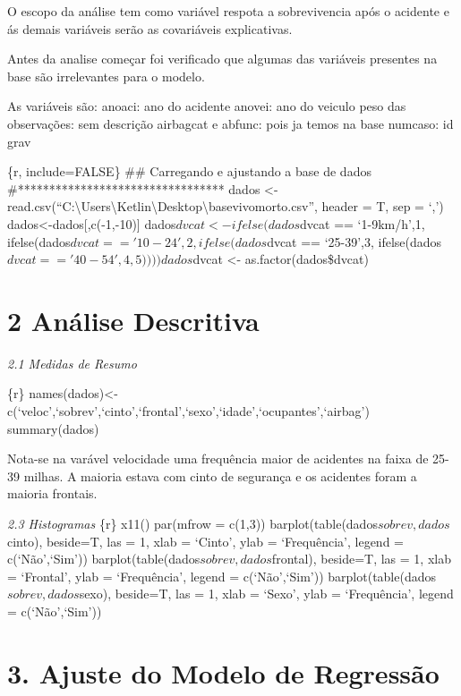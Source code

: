 \documentclass[]{article}
\begin{document}
O escopo da análise tem como variável respota a sobrevivencia após o
acidente e ás demais variáveis serão as covariáveis explicativas.

Antes da analise começar foi verificado que algumas das variáveis
presentes na base são irrelevantes para o modelo.

As variáveis são: anoaci: ano do acidente anovei: ano do veiculo peso
das observações: sem descrição airbagcat e abfunc: pois ja temos na base
numcaso: id grav

\{r, include=FALSE\} \#\# Carregando e ajustando a base de dados
\#********************************* dados \textless{}-
read.csv(``C:\textbackslash{}Users\textbackslash{}Ketlin\textbackslash{}Desktop\textbackslash{}basevivomorto.csv'',
header = T, sep = `,') dados\textless{}-dados{[},c(-1,-10){]}
dados\(dvcat <- ifelse(dados\)dvcat == `1-9km/h',1,
ifelse(dados\(dvcat == '10-24',2,  ifelse(dados\)dvcat == `25-39',3,
ifelse(dados\(dvcat == '40-54',4,5)))) dados\)dvcat \textless{}-
as.factor(dados\$dvcat)

\hypertarget{analise-descritiva}{%
\section{2 Análise Descritiva}\label{analise-descritiva}}

\emph{2.1 Medidas de Resumo}

\{r\}
names(dados)\textless{}-c(`veloc',`sobrev',`cinto',`frontal',`sexo',`idade',`ocupantes',`airbag')
summary(dados)

Nota-se na varável velocidade uma frequência maior de acidentes na faixa
de 25-39 milhas. A maioria estava com cinto de segurança e os acidentes
foram a maioria frontais.

\emph{2.3 Histogramas} \{r\} x11() par(mfrow = c(1,3))
barplot(table(dados\(sobrev,dados\)cinto), beside=T, las = 1, xlab =
`Cinto', ylab = `Frequência', legend = c(`Não',`Sim'))
barplot(table(dados\(sobrev,dados\)frontal), beside=T, las = 1, xlab =
`Frontal', ylab = `Frequência', legend = c(`Não',`Sim'))
barplot(table(dados\(sobrev,dados\)sexo), beside=T, las = 1, xlab =
`Sexo', ylab = `Frequência', legend = c(`Não',`Sim'))

\hypertarget{ajuste-do-modelo-de-regressao}{%
\section{3. Ajuste do Modelo de
Regressão}\label{ajuste-do-modelo-de-regressao}}
\end{document}
